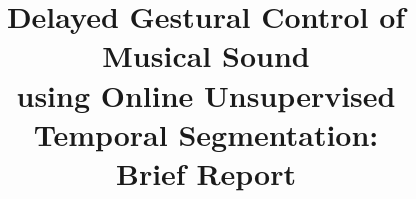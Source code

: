 \documentclass{nime-alternate_ADJ} %
\begin{document}


\title{Delayed Gestural Control of Musical Sound \\
using Online Unsupervised Temporal Segmentation: \\
Brief Report}

%
%
%
%
\end{document}
